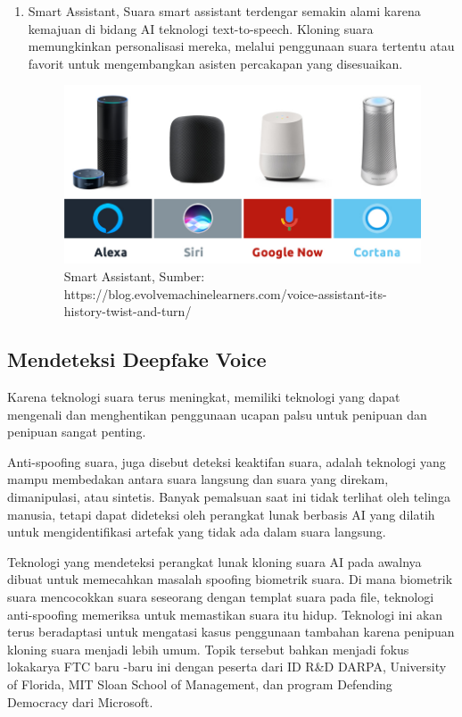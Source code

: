 \begin{enumerate}
\item Smart Assistant, Suara smart assistant terdengar semakin alami karena kemajuan di bidang AI teknologi text-to-speech. Kloning suara memungkinkan personalisasi mereka, melalui penggunaan suara tertentu atau favorit untuk mengembangkan asisten percakapan yang disesuaikan.
\begin{figure}[H]
        \centerline{\includegraphics[scale=.45]{figures/voice-assistants-battle}}
        \caption{Smart Assistant, Sumber: https://blog.evolvemachinelearners.com/voice-assistant-its-history-twist-and-turn/}
		\label{assistant}
\end{figure}

\end{enumerate}

\subsection{Mendeteksi Deepfake Voice}
Karena teknologi suara terus meningkat, memiliki teknologi yang dapat mengenali dan menghentikan penggunaan ucapan palsu untuk penipuan dan penipuan sangat penting. 

Anti-spoofing suara, juga disebut deteksi keaktifan suara, adalah teknologi yang mampu membedakan antara suara langsung dan suara yang direkam, dimanipulasi, atau sintetis. Banyak pemalsuan saat ini tidak terlihat oleh telinga manusia, tetapi dapat dideteksi oleh perangkat lunak berbasis AI yang dilatih untuk mengidentifikasi artefak yang tidak ada dalam suara langsung. 

Teknologi yang mendeteksi perangkat lunak kloning suara AI pada awalnya dibuat untuk memecahkan masalah spoofing biometrik suara. Di mana biometrik suara mencocokkan suara seseorang dengan templat suara pada file, teknologi anti-spoofing memeriksa untuk memastikan suara itu hidup. Teknologi ini akan terus beradaptasi untuk mengatasi kasus penggunaan tambahan karena penipuan kloning suara menjadi lebih umum. Topik tersebut bahkan menjadi fokus lokakarya FTC baru -baru ini dengan peserta dari ID R\&D DARPA, University of Florida, MIT Sloan School of Management, dan program Defending Democracy dari Microsoft.


